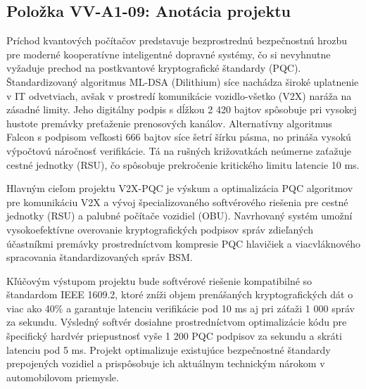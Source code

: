 \documentclass[11pt, a4paper]{article}
\begin{document}
\subsection*{Položka VV-A1-09: Anotácia projektu}
\hspace*{\parindent}Príchod kvantových počítačov predstavuje bezprostrednú bezpečnostnú hrozbu pre moderné kooperatívne inteligentné dopravné systémy, čo si nevyhnutne vyžaduje prechod na postkvantové kryptografické štandardy (PQC). Štandardizovaný algoritmus ML-DSA (Dilithium) síce nachádza široké uplatnenie v IT odvetviach, avšak v prostredí komunikácie vozidlo-všetko (V2X) naráža na zásadné limity. Jeho digitálny podpis s dĺžkou 2 420 bajtov spôsobuje pri vysokej hustote premávky preťaženie prenosových kanálov. Alternatívny algoritmus Falcon s podpisom veľkosti 666 bajtov síce šetrí šírku pásma, no prináša vysokú výpočtovú náročnosť verifikácie. Tá na rušných križovatkách neúmerne zaťažuje cestné jednotky (RSU), čo spôsobuje prekročenie kritického limitu latencie 10 ms.
\newline
\par
Hlavným cieľom projektu V2X-PQC je výskum a optimalizácia PQC algoritmov pre komunikáciu V2X a vývoj špecializovaného softvérového riešenia pre cestné jednotky (RSU) a palubné počítače vozidiel (OBU). Navrhovaný systém umožní vysokoefektívne overovanie kryptografických podpisov správ zdieľaných účastníkmi premávky prostredníctvom kompresie PQC hlavičiek a viacvláknového spracovania štandardizovaných správ BSM.
\newline
\par
Kľúčovým výstupom projektu bude softvérové riešenie kompatibilné so štandardom IEEE 1609.2, ktoré zníži objem prenášaných kryptografických dát o viac ako 40\% a garantuje latenciu verifikácie pod 10 ms aj pri záťaži 1 000 správ za sekundu. Výsledný softvér dosiahne prostredníctvom optimalizácie kódu pre špecifický hardvér priepustnosť vyše 1 200 PQC podpisov za sekundu a skráti latenciu pod 5 ms. Projekt optimalizuje existujúce bezpečnostné štandardy prepojených vozidiel a prispôsobuje ich aktuálnym technickým nárokom v automobilovom priemysle.
\end{document}
